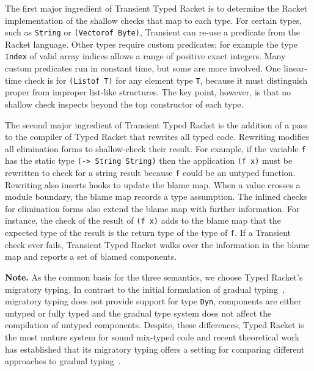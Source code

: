 The first major ingredient of Transient Typed Racket is to determine the
Racket implementation of the shallow checks that map to each type.  For
certain types, such as {\tt String} or {\tt (Vectorof Byte)}, Transient
can re-use a predicate from the Racket language.  Other types require custom
predicates; for example the type {\tt Index} of valid array indices allows
a range of positive exact integers.  Many custom predicates run in
constant time, but some are more involved.  One linear-time check is for
{\tt (Listof T)} for any element type {\tt T}, because it must distinguish
proper from improper list-like structures.  The
key point, however, is that no shallow check inspects beyond the top
constructor of each type.

The second major ingredient of Transient Typed Racket  is the addition of
a pass to the compiler of Typed Racket that rewrites all typed code.
Rewriting modifies all elimination forms to shallow-check their result.
For example, if the variable {\tt f} has the static type {\tt (-> String
String)} then the application {\tt (f x)} must be rewritten to check for a
string result because {\tt f} could be an untyped function.  Rewriting
also inserts hooks to update the blame map.  When a value crosses a module
boundary, the blame map records a type assumption.  The inlined checks
for elimination forms also extend the blame map with further information. For
instance, the check of the result of {\tt (f x)} adds to the blame map
that the expected type of the result is the return type of the type of
{\tt f}.  If a Transient check ever fails, Transient Typed Racket walks over 
the information in the blame map and reports a set of blamed components.

\smallskip
\noindent
{\bf Note.} As the common basis for the three semantics, we choose 
Typed Racket's migratory typing. In contrast to the initial formulation of
gradual typing~\cite{st-sfp-2006}, migratory typing does not provide
support for type \texttt{Dyn}, components are either untyped or fully
typed and the gradual type system does not affect the compilation of
untyped components. Despite, these differences, Typed Racket is the most
mature system for sound mix-typed code
and recent theoretical work has established that
its migratory typing offers a setting for comparing different approaches to gradual
typing~\cite{gf-icfp-2018,gfd-oopsla-2019}.
